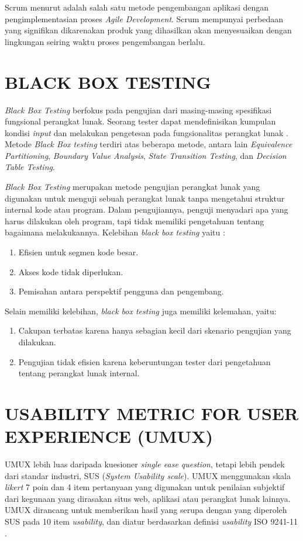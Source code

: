 \par Scrum menurut \citep{wahyudi2018analisis} adalah salah satu metode pengembangan aplikasi dengan pengimplementasian proses \textit{Agile Development}. Scrum mempunyai perbedaan yang signifikan dikarenakan produk yang dihasilkan akan menyesuaikan dengan lingkungan seiring waktu proses pengembangan berlalu.

\section{\uppercase{Black Box Testing}}
\textit{Black Box Testing} berfokus pada pengujian dari masing-masing spesifikasi fungsional perangkat lunak. Seorang tester dapat mendefinisikan kumpulan kondisi \textit{input} dan melakukan pengetesan pada fungsionalitas perangkat lunak \citep{mustaqbal2015pengujian}. Metode \textit{Black Box testing} terdiri atas beberapa metode, antara lain \textit{Equivalence Partitioning}, \textit{Boundary Value Analysis}, \textit{State Transition Testing}, dan \textit{Decision Table Testing}.

\par \textit{Black Box Testing} merupakan metode pengujian perangkat lunak yang digunakan untuk menguji sebuah perangkat lunak tanpa 
mengetahui struktur internal kode atau program. Dalam pengujiannya, penguji menyadari apa yang harus dilakukan oleh program, tapi tidak memiliki pengetahuan tentang bagaimana melakukannya. Kelebihan \textit{black box testing} yaitu :

\begin{enumerate}
	\item Efisien untuk segmen kode besar.
	\item Akses kode tidak diperlukan.
	\item Pemisahan antara perspektif pengguna dan pengembang.
\end{enumerate}

\par Selain memiliki kelebihan, \textit{black box testing} juga memiliki kelemahan, yaitu:

\begin{enumerate}
	\item Cakupan terbatas karena hanya sebagian kecil dari skenario pengujian yang dilakukan. 
	\item Pengujian tidak efisien karena keberuntungan tester dari pengetahuan tentang perangkat lunak internal.
\end{enumerate}

\section{\uppercase{Usability Metric for User Experience (UMUX)}}
UMUX lebih luas daripada kuesioner \textit{single ease question}, tetapi lebih pendek dari standar industri, SUS (\textit{System Usability scale}). UMUX menggunakan skala \textit{likert} 7 poin dan 4 item pertanyaan yang digunakan untuk penilaian subjektif dari kegunaan yang dirasakan situs web, aplikasi atau perangkat lunak lainnya. UMUX dirancang untuk memberikan hasil yang serupa dengan yang diperoleh SUS pada 10 item \textit{usability}, dan diatur berdasarkan definisi \textit{usability} ISO 9241-11 \citep{wahyuningrum2021buku}.

